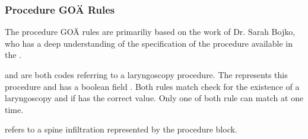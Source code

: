 
\subsubsection{Procedure GOÄ Rules}
The procedure GOÄ rules are primariliy based on the work of Dr. Sarah Bojko, who has a deep understanding of the specification of the procedure available in the \AVS.

 and  are both codes referring to a laryngoscopy procedure.
The  represents this procedure and has a boolean field .
Both rules match check for the existence of a laryngoscopy and if  has the correct value.
Only one of both rule can match at one time.




 refers to a spine infiltration represented by the  procedure block.






